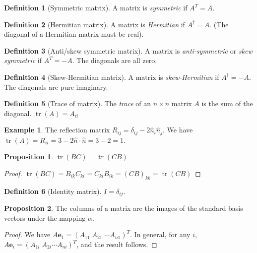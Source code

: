 \documentclass[a4paper]{article}
\theoremstyle{definition}
\newtheorem*{prop}{Proposition}
\newtheorem*{defi}{Definition}
\newtheorem*{eg}{Example}
\newcommand{\mb}[1]{\mathbf{#1}}
\DeclareMathOperator\tr{tr}
\begin{document}
\begin{defi}[Symmetric matrix]
  A matrix is \emph{symmetric} if $A^T = A$.
\end{defi}

\begin{defi}[Hermitian matrix]
 A matrix is \emph{Hermitian} if $A^\dagger = A$. (The diagonal of a Hermitian matrix must be real).
\end{defi}

\begin{defi}[Anti/skew symmetric matrix]
  A matrix is \emph{anti-symmetric} or \emph{skew symmetric} if $A^T = -A$. The diagonals are all zero.
\end{defi}

\begin{defi}[Skew-Hermitian matrix]
  A matrix is \emph{skew-Hermitian} if $A^\dagger = -A$. The diagonals are pure imaginary.
\end{defi}

\begin{defi}[Trace of matrix]
  The \emph{trace} of an $n\times n$ matrix $A$ is the sum of the diagonal. $\tr(A) = A_{ii}$
\end{defi}

\begin{eg}
  The reflection matrix $R_{ij} = \delta_{ij} - 2\hat n_i \hat n_j$. We have $\tr(A) = R_{ii} = 3 - 2\hat{n}\cdot \hat{n} = 3 - 2 = 1$.
\end{eg}

\begin{prop}
  $\tr(BC) = \tr(CB)$
\end{prop}

\begin{proof}
  $\tr(BC) = B_{ik}C_{ki} = C_{ki}B_{ik} = (CB)_{kk} = \tr(CB)$
\end{proof}

\begin{defi}[Identity matrix]
  $I = \delta_{ij}$.
\end{defi}

\begin{prop}
  The columns of a matrix are the images of the standard basis vectors under the mapping $\alpha$.
\end{prop}

\begin{proof}
  We have $A\mb{e}_1 = (A_{11}\; A_{21}\; \cdots A_{n1})^T$. In general, for any $i$, $A\mb{e}_i = (A_{1i}\; A_{2i}\cdots A_{ni})^T$, and the result follows.
\end{proof}
\end{document}
